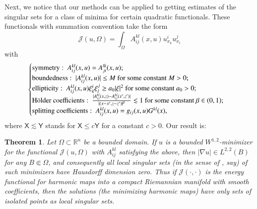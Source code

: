 \documentclass[12pt]{amsart}
\newtheorem{theorem}{Theorem}[section]
\begin{document}
Next, we notice that our methods can be applied to getting estimates of the singular sets for a class of minima for certain quadratic functionals. These functionals with summation convention take the form
\begin{equation}\label{e23}
\mathcal{J}(u,\Omega)=\int_\Omega A^{kl}_{ij}(x,u) u^i_{x_k} u^j_{x_l}
\end{equation}
with
$$
\begin{cases}
{\hbox{symmetry}}:\ A^{kl}_{ij}(x,u)=A^{lk}_{ji}(x,u);\\
{\hbox{boundedness}}:\ |A^{kl}_{ij}(x,u)|\le M\ \hbox{for some constant}\ M>0;\\
{\hbox{ellipticity}}:\ A^{kl}_{ij}(x,u)\xi_k^i\xi_l^j\ge a_0|\xi|^2\ \hbox{for some constant}\ a_0>0;\\
{\hbox{H\"older coefficients}}:\ \frac{|A^{kl}_{ij}(x,z)-A^{kl}_{ij}(x',z')|}{|(x-x',z-z')|^\beta}\lesssim 1\ \hbox{for some constant}\ \beta\in (0,1);\\
{\hbox{splitting coefficients}}:\ A^{kl}_{ij}(x,u)=g_{ij}(x,u)G^{kl}(x),
\end{cases}
$$
where $\mathsf{X}\lesssim\mathsf{Y}$ stands for $\mathsf{X}\le c\mathsf{Y}$ for a constant $c>0$. Our result is:

\begin{theorem}\label{t2} Let $\Omega\subset\mathbb R^n$ be a bounded domain. If $u$ is a bounded $W^{1,2}$-minimizer for the functional $\mathcal{J}(u,\Omega)$ with $A^{kl}_{ij}$ satisfying the above, then $|\nabla u|\in L^{2,2}(B)$ for any $B\Subset\Omega$, and consequently all local singular sets (in the sense of \cite{HL1990}, say) of such minimizers have Hausdorff dimension zero. Thus if $\mathcal{J}(\cdot,\cdot)$ is the energy functional for harmonic maps into a compact Riemannian manifold with smooth coefficients, then the solutions (the minimizing harmonic maps) have only sets of isolated points as local singular sets.
\end{theorem}
\end{document}
